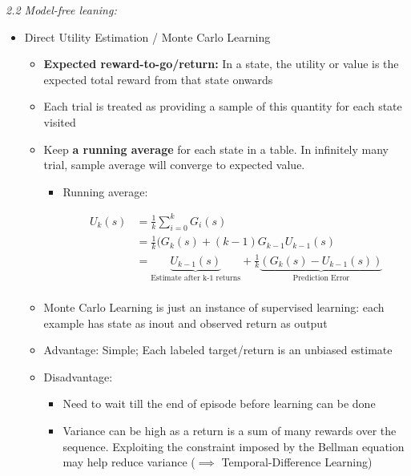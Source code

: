 \documentclass[12pt]{article}
\begin{document}
\noindent
\textsl{2.2 Model-free leaning:}
\begin{itemize}
 \item Direct Utility Estimation / Monte Carlo Learning 
  \begin{itemize}
  \item \textbf{Expected reward-to-go/return:} In a state, the utility or value is the expected total reward from that state onwards
  \item Each trial is treated as providing a sample of this quantity for each state visited 
  \item Keep \textbf{a running average} for each state in a table. In infinitely many trial, sample average will converge to expected value.
 
  \begin{itemize}
  \item Running average: 
  
\begin{equation} \label{eq1}
\begin{split}
U_k (s) & = \frac{1}{k} \sum_{i=0}^{k} G_i(s)  \\
 & = \frac{1}{k} (G_k (s) + (k-1) G_{k-1} U_{k-1}(s)\\
 & = \underbrace{U_{k-1} (s)}_{\text{Estimate after k-1 returns}}+ \frac{1}{k} \underbrace{(G_k (s) - U_{k-1} (s))}_{\text{Prediction Error}} \\
\end{split}
\end{equation}
\end{itemize}
  \item Monte Carlo Learning is just an instance of supervised learning: each example has state as inout and observed return as output
   \item Advantage: Simple; Each labeled target/return is an unbiased estimate
   \item Disadvantage: 
    \begin{itemize}
    \item Need to wait till the end of episode before learning can be done
    \item Variance can be high as a return is a sum of many rewards over the sequence. Exploiting the constraint imposed by the Bellman equation may help reduce variance ($\implies$ Temporal-Difference Learning)
    \end{itemize}
   

\end{itemize}
\end{itemize}
\end{document}
